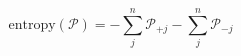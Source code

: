 \begin{equation}
\text{entropy}(\mathcal P) = -\sum_j^n\mathcal P_{+j} -\sum_j^n\mathcal P_{-j}
\end{equation}